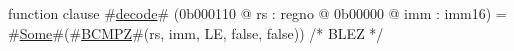 function clause #\hyperref[zdecode]{decode}# (0b000110 @ rs : regno @ 0b00000 @ imm : imm16) =
  #\hyperref[zSome]{Some}#(#\hyperref[zBCMPZ]{BCMPZ}#(rs, imm, LE, false, false)) /* BLEZ */
